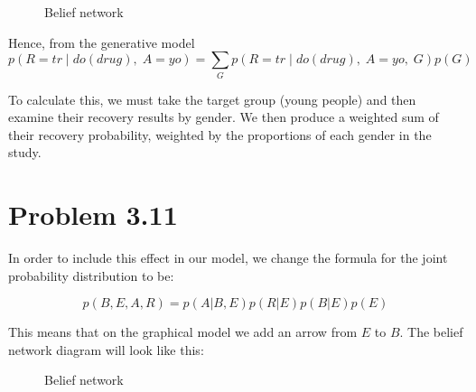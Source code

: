 \documentclass[11pt,a4paper,oneside]{report}
\newcommand{\hilight}[1]{\colorbox{yellow}{#1}}
\begin{document}
\begin{figure}[H]
  \centering
    \caption{Belief network}
    \label{fig:do_calc_DAG}    
\end{figure}

Hence, from the generative model
\begin{equation}
p(R=tr \; | \; do(drug),\; A=yo) =
\sum\limits_{G} p(R=tr \; | \; do(drug), \; A=yo, \; G) p(G)
\end{equation}

To calculate this, we must take the target group (young people) and then examine their
recovery results by gender. We then produce a weighted sum of their recovery
probability, weighted by the proportions of each gender in the study. 


\section*{Problem 3.11}

In order to include this effect in our model, we change the formula for the 
joint probability distribution to be:

$$p(B, E, A, R) = p(A|B, E)p(R|E)p(B|E)p(E)$$

This means that on the graphical model we add an arrow from $E$ to $B$. The 
belief network diagram will look like this:

\begin{figure}[H]
  \centering
    \caption{Belief network}
    \label{fig:all_trade_cca_black}     
\end{figure}
\end{document}
